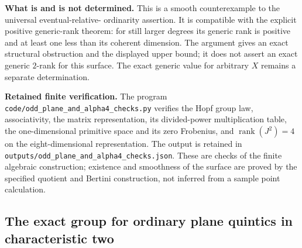 \par\smallskip\noindent\textbf{What is and is not determined.}
This is a smooth counterexample to the universal eventual-relative-
ordinarity assertion.  It is compatible with the explicit positive
generic-rank theorem: for still larger degrees its generic rank is
positive and at least one less than its coherent dimension.  The
argument gives an exact structural obstruction and the displayed
upper bound; it does not assert an exact generic $2$-rank for this
surface.  The exact generic value for arbitrary $X$ remains a
separate determination.

\par\smallskip\noindent\textbf{Retained finite verification.}
The program \texttt{code/odd\_plane\_and\_alpha4\_checks.py} verifies
the Hopf group law, associativity, the matrix representation, its
divided-power multiplication table, the one-dimensional primitive
space and its zero Frobenius, and $\operatorname{rank}(J^2)=4$ on
the eight-dimensional representation.  The output is retained in
\texttt{outputs/odd\_plane\_and\_alpha4\_checks.json}.  These are
checks of the finite algebraic construction; existence and
smoothness of the surface are proved by the specified quotient and
Bertini construction, not inferred from a sample point calculation.

\subsection{The exact group for ordinary plane quintics in characteristic two}
\label{subsec:quintic-exact}

